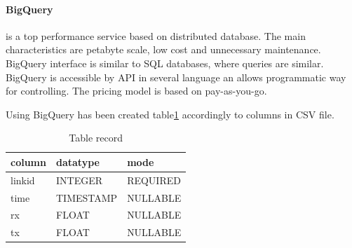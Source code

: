 \documentclass[a4paper,12pt,oneside]{report}
\begin{document}
		\paragraph{BigQuery} is a top performance service based on distributed
database. The main characteristics are petabyte scale, low cost and unnecessary
maintenance. BigQuery interface is
		similar to SQL databases, where queries are similar. BigQuery is accessible by
API in several language an allows programmatic way for controlling. The pricing
model is based on pay-as-you-go.
		
		Using BigQuery has been created table\ref{tab_rec} accordingly to columns in
CSV file. 
		\begin{table}[]
			\centering
			\begin{footnotesize}
			
			\begin{tabular}{@{}|l|l|l|@{}}
				\toprule
				column & datatype  & mode     \\ \midrule
				linkid & INTEGER   & REQUIRED \\ \midrule
				time   & TIMESTAMP & NULLABLE \\ \midrule
				rx     & FLOAT     & NULLABLE \\ \midrule
				tx     & FLOAT     & NULLABLE \\ \bottomrule
			\end{tabular}
			\caption{Table record}
			\label{tab_rec}
			\end{footnotesize}
		\end{table}
		
\end{document}
